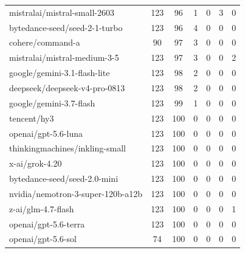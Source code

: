 \begin{tabular}{lcccccc}
mistralai/mistral-small-2603 & 123 & 96 & 1 & 0 & 3 & 0 \\
bytedance-seed/seed-2-1-turbo & 123 & 96 & 4 & 0 & 0 & 0 \\
cohere/command-a & 90 & 97 & 3 & 0 & 0 & 0 \\
mistralai/mistral-medium-3-5 & 123 & 97 & 3 & 0 & 0 & 2 \\
google/gemini-3.1-flash-lite & 123 & 98 & 2 & 0 & 0 & 0 \\
deepseek/deepseek-v4-pro-0813 & 123 & 98 & 2 & 0 & 0 & 0 \\
google/gemini-3.7-flash & 123 & 99 & 1 & 0 & 0 & 0 \\
tencent/hy3 & 123 & 100 & 0 & 0 & 0 & 0 \\
openai/gpt-5.6-luna & 123 & 100 & 0 & 0 & 0 & 0 \\
thinkingmachines/inkling-small & 123 & 100 & 0 & 0 & 0 & 0 \\
x-ai/grok-4.20 & 123 & 100 & 0 & 0 & 0 & 0 \\
bytedance-seed/seed-2.0-mini & 123 & 100 & 0 & 0 & 0 & 0 \\
nvidia/nemotron-3-super-120b-a12b & 123 & 100 & 0 & 0 & 0 & 0 \\
z-ai/glm-4.7-flash & 123 & 100 & 0 & 0 & 0 & 1 \\
openai/gpt-5.6-terra & 123 & 100 & 0 & 0 & 0 & 0 \\
openai/gpt-5.6-sol & 74 & 100 & 0 & 0 & 0 & 0 \\
\bottomrule
\end{tabular}
